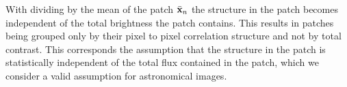 \documentclass[twocolumn]{aastex631}
\DeclareMathOperator{\arcsinh}{arcsinh}
\newcommand{\todo}[1]{\textcolor{red}{TODO: #1}\PackageWarning{TODO:}{#1!}}
\begin{document}
    With dividing by the mean of the patch $\Bar{\mathbf{x}}_n$ the structure in the patch becomes independent of the total brightness the patch contains. This results in patches being grouped only by their pixel to pixel correlation structure and not by total contrast. This corresponds the assumption that the structure in the patch is statistically independent of the total flux contained in the patch, which we consider a valid assumption for astronomical images.
    
    





    

\end{document}
